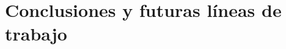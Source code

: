 \chapter{Conclusiones y futuras líneas de trabajo}
\label{cha:conclusiones y futuras lineas de trabajo}
